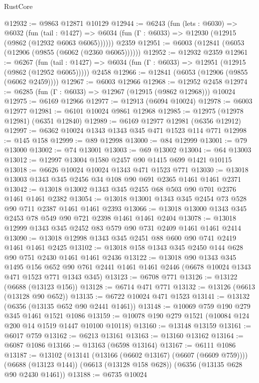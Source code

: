 \begin{lexlean}{RustCore}
\begin{coremodule}
@12932 := @9863 @12871 @10129
@12944 := @6243
    (fun (lets : @6030) =>
    @6032
      (fun (tail : @1427) =>
      @6034 (fun (Γ : @6033) => @12930 (@12915 (@9862 (@12932 @6063 @6065))))))
    @2359
@12951 := @6003 (@12841 (@6053 (@12906 (@9855 (@6062 (@2360 @6065))))))
@12952 := @12932 @2359
@12961 := @6267
    (fun (tail : @1427) => @6034 (fun (Γ : @6033) => @12951 (@12915 (@9862 (@12952 @6065)))))
    @2458
@12966 := @12841 (@6053 (@12906 (@9855 (@6062 @2459))))
@12967 := @6003 @12966
@12968 := @12952 @2458
@12974 := @6285 (fun (Γ : @6033) => @12967 (@12915 (@9862 @12968))) @10024
@12975 := @6169 @12966
@12977 := @12913 (@6094 @10024)
@12978 := @6003 @12977
@12981 := @6101 @10024 @9861 @12968
@12985 := @12975 (@12978 @12981) (@6351 @12840)
@12989 := @6169 @12977 @12981 (@6356 @12912)
@12997 := @6362 @10024 @1343 @1343 @345 @471 @1523 @114 @771
@12998 := @145 @158
@12999 := @89 @12998
@13000 := @84 @12999
@13001 := @79 @13000
@13002 := @74 @13001
@13003 := @69 @13002
@13004 := @64 @13003
@13012 := @12997 @13004 @1580 @2457 @90 @1415 @699 @1421 @10115
@13018 := @6626 @10024 @10024 @1343 @471 @1523 @771
@13030 := @13018 @13003 @1343 @345 @2456 @34 @108 @90 @691 @2365 @1461 @1461 @2371
@13042 := @13018 @13002 @1343 @345 @2455 @68 @503 @90 @701 @2376 @1461 @1461 @2382
@13054 := @13018 @13001 @1343 @345 @2454 @73 @528 @90 @711 @2387 @1461 @1461 @2393
@13066 := @13018 @13000 @1343 @345 @2453 @78 @549 @90 @721 @2398 @1461 @1461 @2404
@13078 := @13018 @12999 @1343 @345 @2452 @83 @579 @90 @731 @2409 @1461 @1461 @2414
@13090 := @13018 @12998 @1343 @345 @2451 @88 @600 @90 @741 @2419 @1461 @1461 @2425
@13102 := @13018 @158 @1343 @345 @2450 @144 @628 @90 @751 @2430 @1461 @1461 @2436
@13122 := @13018
    @90
    @1343
    @345
    @1495
    @156
    @652
    @90
    @761
    @2441
    @1461
    @1461
    @2446
    (@6678 @10024 @1343 @471 @1523 @771 @1343 @345)
@13123 := @6708 @771
@13126 := @13122 (@6688 (@13123 @156))
@13128 := @6714 @471 @771
@13132 := @13126 (@6613 (@13128 @90 @652))
@13135 := @6722 @10024 @471 @1523
@13141 := @13132 (@6356 (@13135 @652 @90 @2441 @1461))
@13148 := @10069 @759 @190 @279 @345 @1461 @1521 @1086
@13159 := @10078 @190 @279 @1521 (@10084 @124 @200 @14 @1519 @1447 @10100 @10118)
@13160 := @13148 @13159
@13161 := @6017 @759
@13162 := @6213 @13161
@13163 := @13160 @13162
@13164 := @6087 @1086
@13166 := @13163 (@6598 @13164)
@13167 := @6111 @1086
@13187 := @13102
    (@13141 (@13166 (@6602 @13167) (@6607 (@6609 @759))))
    (@6688 (@13123 @144))
    (@6613 (@13128 @158 @628))
    (@6356 (@13135 @628 @90 @2430 @1461))
@13188 := @6735 @10024

\end{coremodule}
\end{lexlean}
